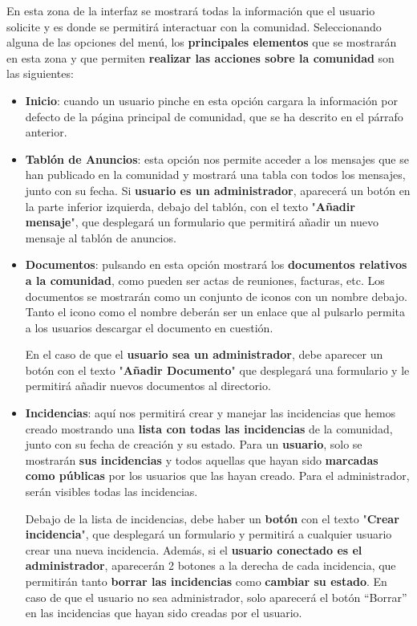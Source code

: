 \begin{appendices}
\begin{itemize}
\begin{itemize}
		En esta zona de la interfaz se mostrará todas la información que el usuario solicite y es donde se permitirá interactuar con la comunidad. Seleccionando alguna de las opciones del menú, los \textbf{principales elementos} que se mostrarán en esta zona y que permiten \textbf{realizar las acciones sobre la comunidad} son las siguientes: 
		
		\begin{itemize}
			\item \textbf{Inicio}: cuando un usuario pinche en esta opción cargara la información por defecto de la página principal de comunidad, que se ha descrito en el párrafo anterior.
			
			\item \textbf{Tablón de Anuncios}: esta opción nos permite acceder a los mensajes que se han publicado en la comunidad y mostrará una tabla con todos los mensajes, junto con su fecha. Si \textbf{usuario es un administrador}, aparecerá un botón en la parte inferior izquierda, debajo del tablón, con el texto "\textbf{Añadir mensaje}", que desplegará un formulario que permitirá añadir un nuevo mensaje al tablón de anuncios.	
			
			\item \textbf{Documentos}: pulsando en esta opción mostrará los \textbf{documentos relativos a la comunidad}, como pueden ser actas de reuniones, facturas, etc. Los documentos se mostrarán como un conjunto de iconos con un nombre debajo. Tanto el icono como el nombre deberán ser un enlace que al pulsarlo permita a los usuarios descargar el documento en cuestión. 
			
			En el caso de que el \textbf{usuario sea un administrador}, debe aparecer un botón con el texto "\textbf{Añadir Documento}" que desplegará una formulario y le permitirá añadir nuevos documentos al directorio. 
			
			\item \textbf{Incidencias}: aquí nos permitirá crear y manejar las incidencias que hemos creado mostrando una \textbf{lista con todas las incidencias} de la comunidad, junto con su fecha de creación y su estado. Para un \textbf{usuario}, solo se mostrarán \textbf{sus incidencias} y todos aquellas que hayan sido \textbf{marcadas como públicas} por los usuarios que las hayan creado. Para el administrador, serán visibles todas las incidencias.
			
			Debajo de la lista de incidencias, debe haber un \textbf{botón} con el texto "\textbf{Crear incidencia}", que desplegará un formulario y permitirá a cualquier usuario crear una nueva incidencia. Además, si el \textbf{usuario conectado es el administrador}, aparecerán 2 botones a la derecha de cada incidencia, que permitirán tanto \textbf{borrar las incidencias} como \textbf{cambiar su estado}. En caso de que el usuario no sea administrador, solo aparecerá el botón ``Borrar'' en las incidencias que hayan sido creadas por el usuario.
			

\end{itemize}
\end{itemize}
\end{itemize}
\end{appendices}
